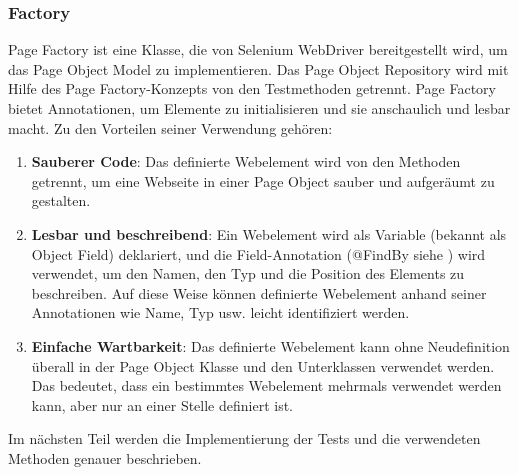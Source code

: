 \subsubsection{Factory}

Page Factory ist eine Klasse, die von Selenium WebDriver bereitgestellt
wird, um das Page Object Model zu implementieren. Das Page Object
Repository wird mit Hilfe des Page Factory-Konzepts von den Testmethoden
getrennt. Page Factory bietet Annotationen, um Elemente zu initialisieren und sie
anschaulich und lesbar macht. Zu den Vorteilen seiner Verwendung gehören:

\begin{enumerate}
    \item \textbf{Sauberer Code}: Das definierte Webelement wird von den Methoden
    getrennt, um eine Webseite in einer Page Object sauber und
    aufgeräumt zu gestalten.
    \item \textbf{Lesbar und beschreibend}: Ein Webelement wird als Variable
    (bekannt als Object Field) deklariert, und die Field-Annotation
    (@FindBy siehe ) wird verwendet, um den Namen, den Typ und
    die Position des Elements zu beschreiben. Auf diese Weise können
    definierte Webelement anhand seiner Annotationen wie Name, Typ
    usw. leicht identifiziert werden.
    \item \textbf{Einfache Wartbarkeit}: Das definierte Webelement kann ohne
    Neudefinition überall in der Page Object Klasse und den Unterklassen
    verwendet werden. Das bedeutet, dass ein bestimmtes Webelement
    mehrmals verwendet werden kann, aber nur an einer Stelle
    definiert ist.
\end{enumerate}


Im nächsten Teil werden die Implementierung der Tests und die verwendeten
Methoden genauer beschrieben. 



